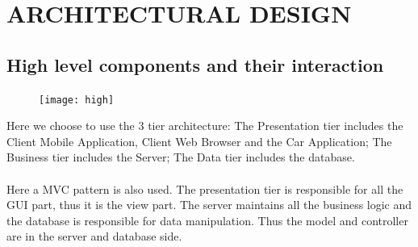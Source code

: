 \documentclass{article}
\begin{document}
	\section{ARCHITECTURAL DESIGN}
	
	\subsection{High level components and their interaction}
	\begin{figure}[h]
	\texttt{[image: high]}
	\end{figure}
	Here we choose to use the 3 tier architecture: The Presentation tier includes the Client Mobile Application, Client Web Browser and the Car Application; The Business tier includes the Server; The Data tier includes the database.
	\\
	\\Here a MVC pattern is also used. The presentation tier is responsible for all the GUI part, thus it is the view part. The server maintains all the business logic and the database is responsible for data manipulation. Thus the model and controller are in the server and database side. 
	\newpage
	
\end{document}
